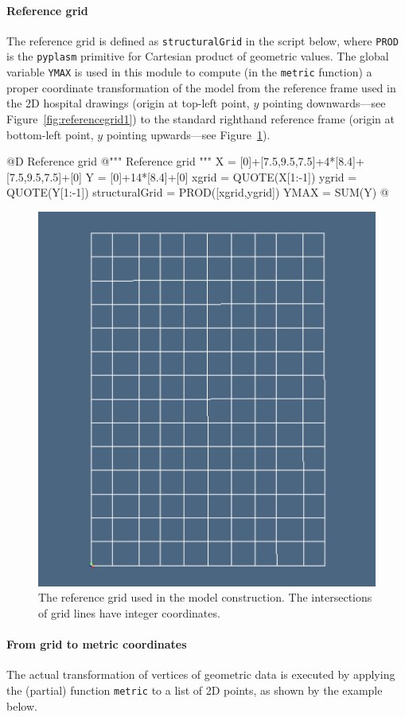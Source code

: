 \documentclass[11pt,oneside]{article}    %
\begin{document}
\paragraph{Reference grid}

The reference grid is defined as \texttt{structuralGrid} in the script below, where \texttt{PROD} is the \texttt{pyplasm} primitive for Cartesian product of geometric values. The global variable \texttt{YMAX} is used in this module to compute (in the \texttt{metric} function) a proper coordinate transformation of the model from the reference frame used in the 2D hospital drawings (origin at top-left point, $y$ pointing downwards---see Figure~\ref{fig:referencegrid1}) to the standard righthand reference frame (origin at bottom-left point, $y$ pointing upwards---see Figure~\ref{fig:referencegrid2}).

@D Reference grid
@{""" Reference grid """
X = [0]+[7.5,9.5,7.5]+4*[8.4]+[7.5,9.5,7.5]+[0]
Y = [0]+14*[8.4]+[0]
xgrid = QUOTE(X[1:-1])
ygrid = QUOTE(Y[1:-1])
structuralGrid = PROD([xgrid,ygrid])
YMAX = SUM(Y)
@}


\begin{figure}[htbp] %
   \centering
   \includegraphics[width=0.33\linewidth]{images/hospitalgrid} 
   \caption{The reference grid used in the model construction. The intersections of grid lines have integer coordinates.}
   \label{fig:referencegrid2}
\end{figure}



\paragraph{From grid to metric coordinates}
The actual transformation of vertices of geometric data is executed by applying the (partial) function \texttt{metric} to a list of 2D points, as shown by the example below.
\end{document}
